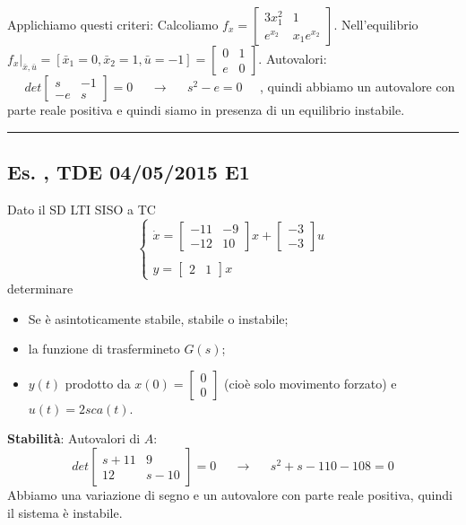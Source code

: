 Applichiamo questi criteri:\newline
Calcoliamo $f_x = \left[\begin{matrix}
    3x_1^2 & 1 \\
    e^{x_2} & x_1 e^{x_2}
\end{matrix}\right]$. \newline
Nell'equilibrio $f_x |_{\bar{x}, \bar{u}}=  [\bar{x}_1 = 0, \bar{x}_2 = 1, \bar{u} = -1] = \left[\begin{matrix}
    0 & 1 \\ e & 0
\end{matrix}\right]$.\newline
Autovalori: $\;\;\;\;\;det \left[\begin{matrix}
    s & -1 \\ -e & s
\end{matrix}\right] = 0 \;\;\;\;\; \rightarrow  \;\;\;\;\; s^2 - e = 0 \;\;\;\;\;$, quindi abbiamo un autovalore con parte reale positiva e quindi siamo in presenza di un equilibrio instabile.\newline
\rule{\textwidth}{0,4pt}
\subsection{Es. , TDE 04/05/2015 E1}
Dato il SD LTI SISO a TC 
\[
    \begin{cases}
        \dot{x} = \left[\begin{matrix}
            -11 & -9 \\ -12 & 10 
        \end{matrix}\right]x + \left[\begin{matrix}
            -3\\-3
        \end{matrix}\right] u \\
        \\
        y = \left[\begin{matrix}
            2 &1
        \end{matrix}\right] x
    \end{cases}
\]
determinare
\begin{itemize}
    \item Se è asintoticamente stabile, stabile o instabile;
    \item la funzione di trasfermineto $G(s)$;
    \item $y(t)$ prodotto da $x(0) = \left[\begin{matrix}
        0\\0
    \end{matrix}\right]$ (cioè solo movimento forzato) e $u(t) = 2 sca(t)$. 
\end{itemize}
\textbf{Stabilità}:\newline
Autovalori di $A$:
\[
    det \left[\begin{matrix}
        s +11 & 9 \\ 12 & s-10
    \end{matrix}\right] = 0 \;\;\;\;\;\rightarrow \;\;\;\;\; s^2 + s -110 -108 = 0
\]
Abbiamo una variazione di segno e un autovalore con parte reale positiva, quindi il sistema è instabile.\newline
\newline
